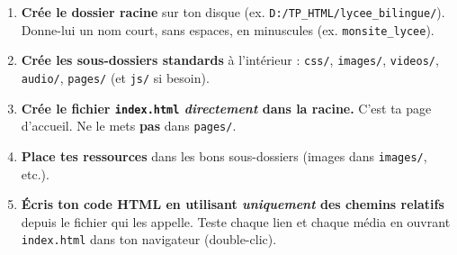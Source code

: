 \documentclass[11pt]{article}
\begin{document}
\begin{methode}
\begin{enumerate}
    \item \textbf{Crée le dossier racine} sur ton disque (ex. \texttt{D:/TP\_HTML/lycee\_bilingue/}). Donne-lui un nom court, sans espaces, en minuscules (ex. \texttt{monsite\_lycee}).
    \item \textbf{Crée les sous-dossiers standards} à l'intérieur : \texttt{css/}, \texttt{images/}, \texttt{videos/}, \texttt{audio/}, \texttt{pages/} (et \texttt{js/} si besoin).
    \item \textbf{Crée le fichier \texttt{index.html} \emph{directement} dans la racine.} C'est ta page d'accueil. Ne le mets \textbf{pas} dans \texttt{pages/}.
    \item \textbf{Place tes ressources} dans les bons sous-dossiers (images dans \texttt{images/}, etc.).
    \item \textbf{Écris ton code HTML en utilisant \emph{uniquement} des chemins relatifs} depuis le fichier qui les appelle. Teste chaque lien et chaque média en ouvrant \texttt{index.html} dans ton navigateur (double-clic).
\end{enumerate}
\end{methode}
\end{document}
